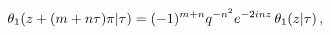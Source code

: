 \[\mathop{\theta_{1}\/}\nolimits\!\left(z+(m+n\tau)\pi\middle|\tau\right)=(-1)^{%
m+n}q^{-n^{2}}e^{-2inz}\mathop{\theta_{1}\/}\nolimits\!\left(z\middle|\tau%
\right),\]